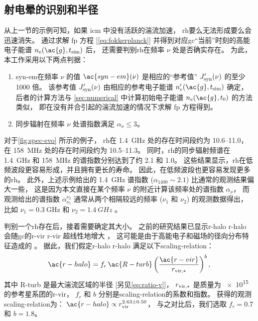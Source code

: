 \subsection{射电晕的识别和半径}
\label{sec:halo-size}

从上一节的示例可知，如果 \ac{icm} 中没有活跃的湍流加速，
\ac{rh}要么无法形成要么会迅速消失。
通过求解 \ac{fp} 方程 [\autoref{eq:fokkerplanck}]
并得到对应\ac{gc}\enquote{当前}时刻的高能电子能谱 $n_e(\ac{g}, t_{\R{sim}})$ 后，
还需要判别\ac{rh}在频率 $\nu$ 处是否确实存在。
为此，本工作采用以下两点判据：
\begin{enumerate}
  \item \acl{syn-em}在频率 $\nu$ 的值 $\ac{syn-em}(\nu)$
    是相应的\enquote{参考值} $J'_{\mathrm{syn}}(\nu)$ 的至少 1000 倍。
    该参考值 $J'_{\mathrm{syn}}(\nu)$ 由相应的参考电子能谱
    $n'_e(\ac{g}, t_{\R{sim}})$ 确定，
    后者的计算方法与 \autoref{sec:numerical} 中计算初始电子能谱
    $n_e(\ac{g}, t_0)$ 的方法类似，
    即在没有并合引起的湍流加速的情况下求解 \ac{fp} 方程得到。

  \item 同步辐射在频率 $\nu$ 处谱指数满足 $\alpha_{\nu} \le 3$。
\end{enumerate}

对于\autoref{fig:spec-evo} 所示的例子，
\ac{rh}在 \SI{1.4}{\GHz} 处的存在时间段约为 \SIrange{10.6}{11.0}{\Gyr}，
在 \SI{158}{\MHz} 处的存在时间段约为 \SIrange{10.5}{11.3}{\Gyr}。
同时，\ac{rh}的同步辐射频谱在 \SI{1.4}{\GHz} 和 \SI{158}{\MHz}
的谱指数分别达到了约 2.1 和 1.0。
这些结果显示，\ac{rh}在低频波段更容易形成，并且拥有更长的寿命。
因此，在低频波段也更容易发现更多的\ac{rh}。
此外，上述示例给出的 \SI{1.4}{\GHz} 谱指数 ($\alpha_{1400} \sim 2.1$)
比通常的观测结果\cite{feretti2012}偏大一些，
这是因为本文直接在某个频率 $\nu$ 的附近计算该频率处的谱指数 $\alpha_{\nu}$，
而观测给出的谱指数 $\alpha_{\nu_1}^{\nu_2}$ 通常从两个相隔较远的频率
($\nu_1$ 和 $\nu_2$) 的观测数据得出，
比如 $\nu_1 = \SI{0.3}{\GHz}$ 和 $\nu_2 = \SI{1.4}{GHz}$ \cite{feretti2012}。

判别一个\ac{rh}存在后，接着需要确定其大小。
之前的研究结果已显示\acl{r-halo} \ac{r-halo}
会随\ac{gc}的\acl{r-vir} \ac{r-vir} 超线性地增大 \cite{cassano2007,basu2012}，
这可能是由于高能电子和磁场的径向分布特征造成的 \cite{dolag2002}。
据此，我们假定\acl{r-halo} \ac{r-halo} 满足以下\ac{scaling-relation}：
\begin{equation}
  \label{eq:r-halo}
  \ac{r-halo} = f_r \,\ac{R-turb}
    \left( \frac{\ac{r-vir}}{r_{\R{vir,*}}} \right)^b ,
\end{equation}
其中
\ac{R-turb} 是最大湍流区域的半径 [另见\autoref{eq:ratio-v}]，
$r_{\mathrm{vir,*}}$ 是质量为 \SI{e15}{\solarmass} 的参考星系团的\acl{r-vir}，
$f_r$ 和 $b$ 分别是\ac{scaling-relation}的系数和指数。
 获得的观测\ac{scaling-relation}为：
$\ac{r-halo} \propto r_{\R{vir}}^{2.63 \pm 0.50}$，
与之对比后，我们选取 $f_r = 0.7$ 和 $b = 1.8$。

